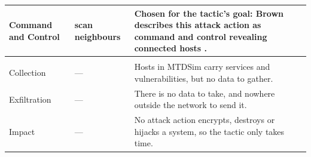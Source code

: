 \begin{table}[htbp]
\begin{tabular}{@{}l l P{0.52\textwidth}@{}}
Command and Control & scan neighbours & Chosen for the tactic's goal: Brown describes this attack action as command and control revealing connected hosts \citep{brown2023}. \\
\midrule
{} \\
Collection & --- & Hosts in MTDSim carry services and vulnerabilities, but no data to gather. \\
Exfiltration & --- & There is no data to take, and nowhere outside the network to send it. \\
Impact & --- & No attack action encrypts, destroys or hijacks a system, so the tactic only takes time. \\
\bottomrule
\end{tabular}
\end{table}
